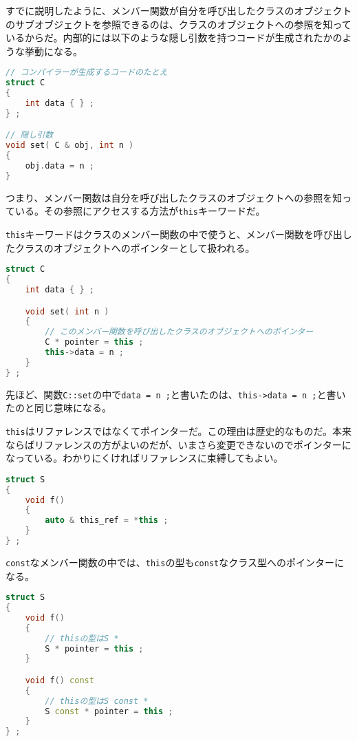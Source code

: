 すでに説明したように、メンバー関数が自分を呼び出したクラスのオブジェクトのサブオブジェクトを参照できるのは、クラスのオブジェクトへの参照を知っているからだ。内部的には以下のような隠し引数を持つコードが生成されたかのような挙動になる。

\begin{lstlisting}[language={C++}]
// コンパイラーが生成するコードのたとえ
struct C
{
    int data { } ;
} ;

// 隠し引数
void set( C & obj, int n )
{
    obj.data = n ;
}
\end{lstlisting}

つまり、メンバー関数は自分を呼び出したクラスのオブジェクトへの参照を知っている。その参照にアクセスする方法が\texttt{this}キーワードだ。

\texttt{this}キーワードはクラスのメンバー関数の中で使うと、メンバー関数を呼び出したクラスのオブジェクトへのポインターとして扱われる。

\begin{lstlisting}[language={C++}]
struct C
{
    int data { } ;

    void set( int n )
    {
        // このメンバー関数を呼び出したクラスのオブジェクトへのポインター
        C * pointer = this ;
        this->data = n ;
    }
} ;
\end{lstlisting}

先ほど、関数\texttt{C::set}の中で\texttt{data = n ;}と書いたのは、\texttt{this->data = n ;}と書いたのと同じ意味になる。

\texttt{this}はリファレンスではなくてポインターだ。この理由は歴史的なものだ。本来ならばリファレンスの方がよいのだが、いまさら変更できないのでポインターになっている。わかりにくければリファレンスに束縛してもよい。

\begin{lstlisting}[language={C++}]
struct S
{
    void f()
    {
        auto & this_ref = *this ;
    }
} ;
\end{lstlisting}

\texttt{const}なメンバー関数の中では、\texttt{this}の型も\texttt{const}なクラス型へのポインターになる。

\begin{lstlisting}[language={C++}]
struct S
{
    void f()
    {
        // thisの型はS *
        S * pointer = this ;
    }

    void f() const
    {
        // thisの型はS const *
        S const * pointer = this ;
    }
} ;
\end{lstlisting}

